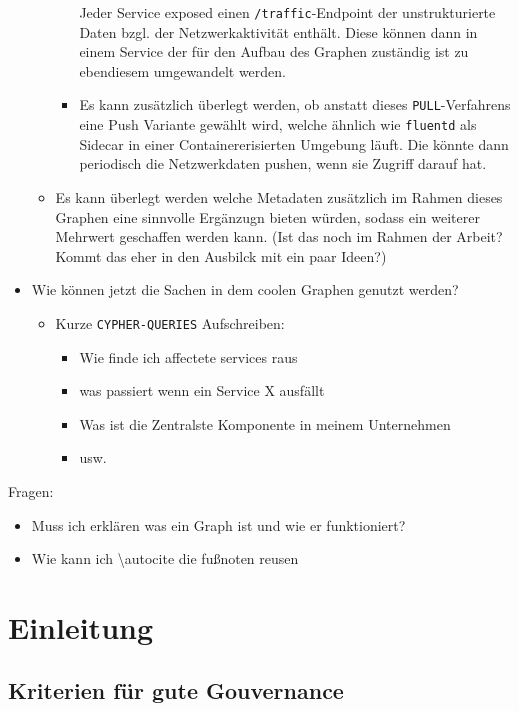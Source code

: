 \documentclass[
	12pt,
	BCOR=5mm,
	DIV=12,
	headinclude=on,
	footinclude=off,
	parskip=half,
	bibliography=totoc,
	listof=entryprefix,
	toc=listof,
	numbers=noenddot,
	plainfootsepline
]{scrreprt}
\begin{document}
\begin{itemize}
\begin{itemize}
\begin{itemize}
			Jeder Service exposed einen \texttt{/traffic}-Endpoint der unstrukturierte Daten bzgl. der Netzwerkaktivität enthält. Diese können dann in einem Service der für den Aufbau des Graphen zuständig ist zu ebendiesem umgewandelt werden.
			\item Es kann zusätzlich überlegt werden, ob anstatt dieses \texttt{PULL}-Verfahrens eine Push Variante gewählt wird, welche ähnlich wie \texttt{fluentd} als Sidecar in einer Containererisierten Umgebung läuft. Die könnte dann periodisch die Netzwerkdaten pushen, wenn sie Zugriff darauf hat.
		\end{itemize}
		\item Es kann überlegt werden welche Metadaten zusätzlich im Rahmen dieses Graphen eine sinnvolle Ergänzugn bieten würden, sodass ein weiterer Mehrwert geschaffen werden kann. (Ist das noch im Rahmen der Arbeit? Kommt das eher in den Ausbilck mit ein paar Ideen?)
	\end{itemize}
	\item Wie können jetzt die Sachen in dem coolen Graphen genutzt werden?
	\begin{itemize}
		\item Kurze \texttt{CYPHER-QUERIES} Aufschreiben:
		\begin{itemize}
			\item Wie finde ich affectete services raus
			\item was passiert wenn ein Service X ausfällt
			\item Was ist die Zentralste Komponente in meinem Unternehmen
			\item usw.
		\end{itemize}
	\end{itemize}
\end{itemize}

Fragen:
\begin{itemize}
	\item Muss ich erklären was ein Graph ist und wie er funktioniert?
	\item Wie kann ich \textbackslash autocite die fußnoten reusen
\end{itemize}

\chapter{Einleitung}



\section{Kriterien für gute Gouvernance}
\end{document}
